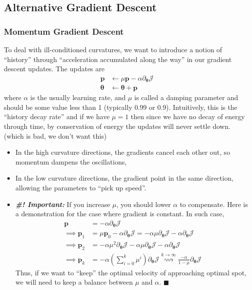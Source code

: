 \documentclass[11pt]{article}
\newcommand{\bp}{\mathbf{p}}
\newcommand{\qed}{\hfill $\blacksquare$}
\begin{document}
\subsection{Alternative Gradient Descent}
\subsubsection{Momentum Gradient Descent}
To deal with ill-conditioned curvatures, we want to introduce a notion of ``history'' through ``acceleration accumulated along the way'' in our gradient descent updates. The updates are
\begin{align}
    \mathbf{p} &\gets \mu\mathbf{p} - \alpha \partial_{\boldsymbol{\theta}} \mathcal{J} \\
    \boldsymbol{\theta} &\gets \boldsymbol{\theta} + \bp
\end{align}
where $\alpha$ is the usually learning rate, and $\mu$ is called a damping parameter and should be some value less than 1 (typically 0.99 or 0.9). Intuitively, this is the ``history decay rate'' and if we have $\mu = 1$ then since we have no decay of energy through time, by conservation of energy the updates will never settle down. (which is bad, we don't want this)
\begin{itemize}
    \item In the high curvature directions, the gradients cancel each other out, so momentum dampens the oscillations, 
    \item In the low curvature directions, the gradient point in the same direction, allowing the parameters to ``pick up speed''.
    \item \textit{\textbf{\#! Important:}} If you increase $\mu$, you should lower $\alpha$ to compensate. Here is a demonstration for the case where gradient is constant. In such case, 
        \begin{align}
            \bp &= -\alpha \partial_{\boldsymbol{\theta}}\mathcal{J} \\
            \implies \bp_1 &= \mu \bp_0 - \alpha \partial_{\boldsymbol{\theta}} \mathcal{J} = - \alpha \mu \partial_{\boldsymbol{\theta}} \mathcal{J} - \alpha \partial_{\boldsymbol{\theta}} \mathcal{J} \\
            \implies \bp_2 &= - \alpha\mu^2 \partial_{\boldsymbol{\theta}} \mathcal{J} - \alpha\mu \partial_{\boldsymbol{\theta}} \mathcal{J} - \alpha \partial_{\boldsymbol{\theta}} \mathcal{J} \\
            \implies \bp_k &= -\alpha \left(\sum_{i = 0}^k \mu^i\right) \partial_{\boldsymbol{\theta}} \mathcal{J} \overset{k\rightarrow\infty}{\rightsquigarrow} \frac{-\alpha}{1 - \mu} \partial_{\boldsymbol{\theta}} \mathcal{J}
        \end{align}
    Thus, if we want to ``keep'' the optimal velocity of approaching optimal spot, we will need to keep a balance between $\mu$ and $\alpha$. \qed
\end{itemize}
\end{document}
